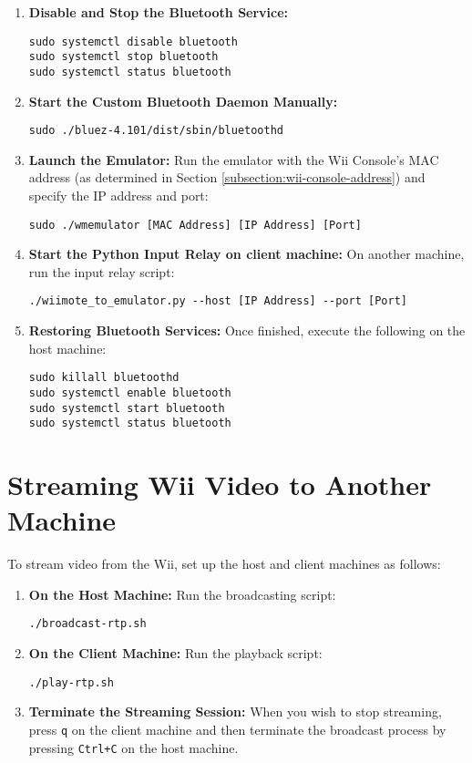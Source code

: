 \begin{enumerate}
	\item \textbf{Disable and Stop the Bluetooth Service:}
	      \begin{verbatim}
sudo systemctl disable bluetooth
sudo systemctl stop bluetooth
sudo systemctl status bluetooth
    \end{verbatim}

	\item \textbf{Start the Custom Bluetooth Daemon Manually:}
	      \begin{verbatim}
sudo ./bluez-4.101/dist/sbin/bluetoothd
    \end{verbatim}

	\item \textbf{Launch the Emulator:}
	      Run the emulator with the Wii Console's MAC address (as determined in Section \ref{subsection:wii-console-address})
	      and specify the IP address and port:
	      \begin{verbatim}
sudo ./wmemulator [MAC Address] [IP Address] [Port]
    \end{verbatim}

	\item \textbf{Start the Python Input Relay on client machine:}
	      On another machine, run the input relay script:
	      \begin{verbatim}
./wiimote_to_emulator.py --host [IP Address] --port [Port]
\end{verbatim}


	\item \textbf{Restoring Bluetooth Services:}
	      Once finished, execute the following on the host machine:
	      \begin{verbatim}
sudo killall bluetoothd
sudo systemctl enable bluetooth
sudo systemctl start bluetooth
sudo systemctl status bluetooth
    \end{verbatim}
\end{enumerate}

\section{Streaming Wii Video to Another Machine}

To stream video from the Wii, set up the host and client machines as follows:

\begin{enumerate}
	\item \textbf{On the Host Machine:}
	      Run the broadcasting script:
	      \begin{verbatim}
./broadcast-rtp.sh
    \end{verbatim}

	\item \textbf{On the Client Machine:}
	      Run the playback script:
	      \begin{verbatim}
./play-rtp.sh
    \end{verbatim}


	\item \textbf{Terminate the Streaming Session:}
	      When you wish to stop streaming, press \texttt{q} on the client machine and then terminate the broadcast process by pressing \texttt{Ctrl+C} on the host machine.
\end{enumerate}
